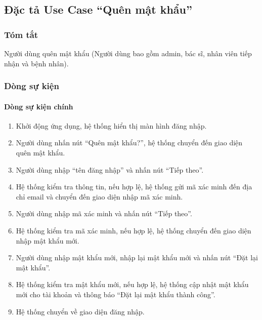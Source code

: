 \subsection{Đặc tả Use Case ``Quên mật khẩu''}

\subsubsection{Tóm tắt}
Người dùng quên mật khẩu (Người dùng bao gồm admin, bác sĩ, nhân viên tiếp nhận và bệnh nhân).

\subsubsection{Dòng sự kiện}
\paragraph{\textbf{Dòng sự kiện chính}}
\begin{enumerate}
  \item Khởi động ứng dụng, hệ thống hiển thị màn hình đăng nhập.
  \item Người dùng nhấn nút ``Quên mật khẩu?'', hệ thống chuyển đến giao diện quên mật khẩu.
  \item Người dùng nhập ``tên đăng nhập'' và nhấn nút ``Tiếp theo''.
  \item Hệ thống kiểm tra thông tin, nếu hợp lệ, hệ thống gửi mã xác minh đến địa chỉ email và chuyển đến giao diện nhập mã xác minh.
  \item Người dùng nhập mã xác minh và nhấn nút ``Tiếp theo''.
  \item Hệ thống kiểm tra mã xác minh, nếu hợp lệ, hệ thống chuyển đến giao diện nhập mật khẩu mới.
  \item Người dùng nhập mật khẩu mới, nhập lại mật khẩu mới và nhấn nút ``Đặt lại mật khẩu''.
  \item Hệ thống kiểm tra mật khẩu mới, nếu hợp lệ, hệ thống cập nhật mật khẩu mới cho tài khoản và thông báo ``Đặt lại mật khẩu thành công''.
  \item Hệ thống chuyển về giao diện đăng nhập.
\end{enumerate}

